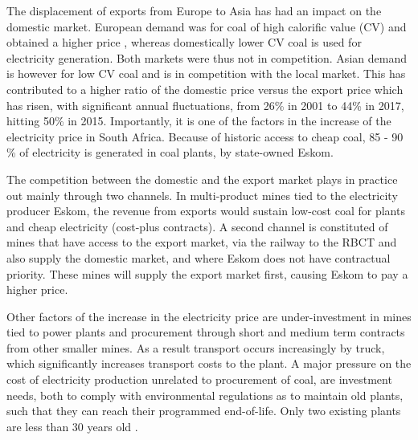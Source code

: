 \documentclass[12pt,english]{article}
\begin{document}
The displacement of exports from Europe to Asia has had an impact on the domestic market. European demand was for coal of high calorific value (CV) and obtained a higher price \citep{burton2018coal}, whereas domestically lower CV coal is used for electricity generation. Both markets were thus not in competition. Asian demand is however for low CV coal and is in competition with the local market. This has contributed to a higher ratio of the domestic price versus the export price which has risen, with significant annual fluctuations, from 26\% in 2001 to 44\% in 2017, hitting 50\% in 2015. Importantly, it is one of the factors in the increase of the electricity price in South Africa. Because of historic access to cheap coal, 85 - 90 \% of electricity is generated in coal plants, by state-owned Eskom.

The competition between the domestic and the export market plays in practice out mainly through two channels. In multi-product mines tied to the electricity producer Eskom, the revenue from exports would sustain low-cost coal for plants and cheap electricity (cost-plus contracts).
A second channel is constituted of mines that have access to the export market, via the railway to the RBCT and also supply the domestic market, and where Eskom does not have contractual priority. These mines will supply the export market first, causing Eskom to pay a higher price.

Other factors of the increase in the electricity price are under-investment in mines tied to power plants and procurement through short and medium term contracts from other smaller mines. As a result transport occurs increasingly by truck, which significantly increases transport costs to the plant. A major pressure on the cost of electricity production unrelated to procurement of coal, are investment needs, both to comply with environmental regulations as to maintain old plants, such that they can reach their programmed end-of-life. Only two existing plants are less than 30 years old \citep{burton2018coal}.
\end{document}
